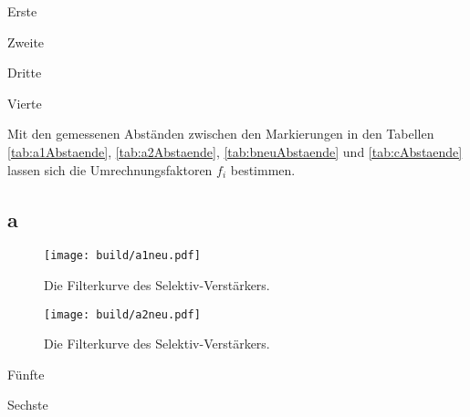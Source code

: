 \begin{center}
	\begin{table}
		\begin{minipage}[t]{0.5\textwidth}
			\caption{Erste}
			\centering
			
		\end{minipage}
		\begin{minipage}[t]{0.5\textwidth}
			\caption{Zweite}
			\centering
			
		\end{minipage}
	\end{table}
\end{center}
\begin{center}
	\begin{table}
		\begin{minipage}[t]{0.5\textwidth}
			\caption{Dritte}
			\centering
			
		\end{minipage}
		\begin{minipage}[t]{0.5\textwidth}
			\caption{Vierte}
			\centering
			
		\end{minipage}
	\end{table}
\end{center}
Mit den gemessenen Abständen zwischen den Markierungen in den Tabellen \ref{tab:a1Abstaende}, \ref{tab:a2Abstaende}, \ref{tab:bneuAbstaende} und \ref{tab:cAbstaende} lassen sich die Umrechnungsfaktoren $f_i$ bestimmen.


\subsection{a}
\begin{figure}
	\centering
	\caption{Die Filterkurve des Selektiv-Verstärkers.}
	\texttt{[image: build/a1neu.pdf]}
	\label{fig:GraphSelektiv}
\end{figure}
\begin{figure}
	\centering
	\caption{Die Filterkurve des Selektiv-Verstärkers.}
	\texttt{[image: build/a2neu.pdf]}
	\label{fig:GraphSelektiv}
\end{figure}
\begin{table}
	\caption{Fünfte}
	\centering
	
\end{table}
\begin{table}
	\caption{Sechste}
	\centering
	
\end{table}

